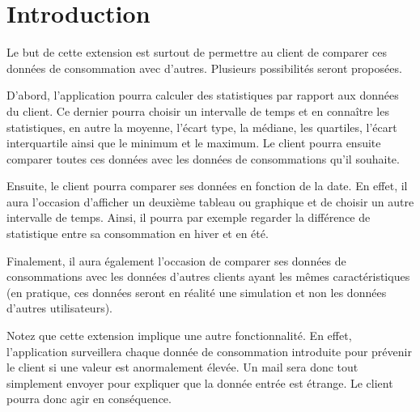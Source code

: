 \section{Introduction}

\begin{flushleft}
Le but de cette extension est surtout de permettre au client de comparer ces données de consommation avec d'autres. Plusieurs possibilités seront proposées.
\end{flushleft}

\begin{flushleft}
D'abord, l'application pourra calculer des statistiques par rapport aux données du client. Ce dernier pourra choisir un intervalle de temps et en connaître les statistiques, en autre la moyenne, l'écart type, la médiane, les quartiles, l'écart interquartile ainsi que le minimum et le maximum. Le client pourra ensuite comparer toutes ces données avec les données de consommations qu'il souhaite.
\end{flushleft}

\begin{flushleft}
Ensuite, le client pourra comparer ses données en fonction de la date. En effet, il aura l'occasion d'afficher un deuxième tableau ou graphique et de choisir un autre intervalle de temps. Ainsi, il pourra par exemple regarder la différence de statistique entre sa consommation en hiver et en été.
\end{flushleft}

\begin{flushleft}
Finalement, il aura également l'occasion de comparer ses données de consommations avec les données d'autres clients ayant les mêmes caractéristiques (en pratique, ces données seront en réalité une simulation et non les données d'autres utilisateurs).
\end{flushleft}

\begin{flushleft}
Notez que cette extension implique une autre fonctionnalité. En effet, l'application surveillera chaque donnée de consommation introduite pour prévenir le client si une valeur est anormalement élevée. Un mail sera donc tout simplement envoyer pour expliquer que la donnée entrée est étrange. Le client pourra donc agir en conséquence.
\end{flushleft}
